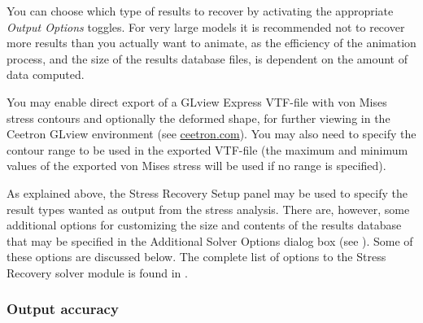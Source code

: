 {\begin{bulletlist}
  \setcounter{enumi}{1}
\item
  You can choose which type of results to recover by activating the appropriate
  {\sl Output Options} toggles. For very large models it is recommended not to
  recover more results than you actually want to animate, as the efficiency of
  the animation process, and the size of the results database files,
  is dependent on the amount of data computed.


\item
  You may enable direct export of a GLview Express VTF-file with von Mises
  stress contours and optionally the deformed shape, for further viewing in the
  Ceetron GLview environment (see \href{https://www.ceetron.com}{ceetron.com}).
  You may also need to specify the contour range to be used in the exported
  VTF-file (the maximum and minimum values of the exported von Mises stress
  will be used if no range is specified).
\end{bulletlist}




As explained above, the Stress Recovery Setup panel may be used to specify the
result types wanted as output from the stress analysis.
There are, however, some additional options for customizing the size and
contents of the results database that may be specified in the Additional Solver
Options dialog box (see
).
Some of these options are discussed below.
The complete list of options to the Stress Recovery solver module is found in
.

\subsubsection{Output accuracy}

}
